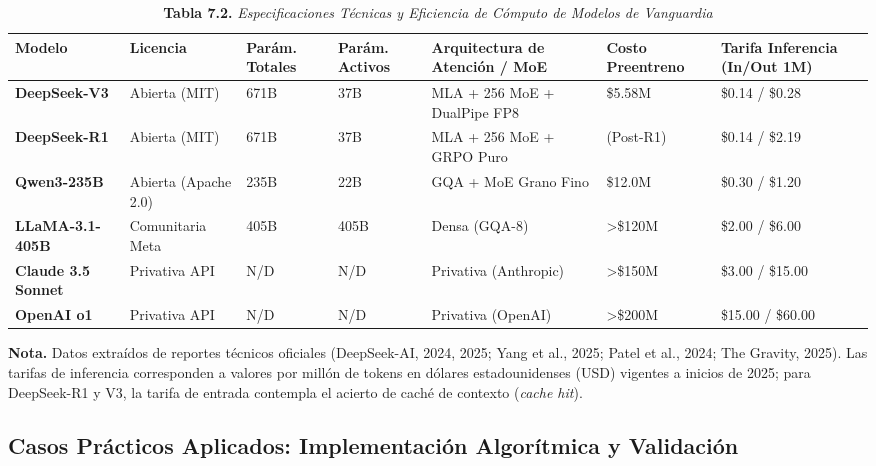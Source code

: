 \begin{table}[htpb!]
\centering
\footnotesize
\renewcommand{\arraystretch}{1.3}
\caption{\textbf{Tabla 7.2.} \textit{Especificaciones Técnicas y Eficiencia de Cómputo de Modelos de Vanguardia}}
\label{tab:modelos_comparativa}
\begin{tabularx}{\textwidth}{>{\raggedright\arraybackslash\bfseries}p{2.3cm} >{\raggedright\arraybackslash}p{2.0cm} >{\centering\arraybackslash}p{1.5cm} >{\centering\arraybackslash}p{1.5cm} >{\raggedright\arraybackslash}X >{\centering\arraybackslash}p{1.6cm} >{\centering\arraybackslash}p{2.2cm}}
\toprule
Modelo & Licencia & Parám. Totales & Parám. Activos & Arquitectura de Atención / MoE & Costo Preentreno & Tarifa Inferencia (In/Out 1M) \\
\midrule
DeepSeek-V3 & Abierta (MIT) & 671B & 37B & MLA + 256 MoE + DualPipe FP8 & \$5.58M & \$0.14 / \$0.28 \\
DeepSeek-R1 & Abierta (MIT) & 671B & 37B & MLA + 256 MoE + GRPO Puro & (Post-R1) & \$0.14 / \$2.19 \\
Qwen3-235B & Abierta (Apache 2.0) & 235B & 22B & GQA + MoE Grano Fino & \$12.0M & \$0.30 / \$1.20 \\
LLaMA-3.1-405B & Comunitaria Meta & 405B & 405B & Densa (GQA-8) & >\$120M & \$2.00 / \$6.00 \\
Claude 3.5 Sonnet & Privativa API & N/D & N/D & Privativa (Anthropic) & >\$150M & \$3.00 / \$15.00 \\
OpenAI o1 & Privativa API & N/D & N/D & Privativa (OpenAI) & >\$200M & \$15.00 / \$60.00 \\
\bottomrule
\end{tabularx}
\vspace{0.1cm}
\raggedright
\scriptsize \textbf{Nota.} Datos extraídos de reportes técnicos oficiales (DeepSeek-AI, 2024, 2025; Yang et al., 2025; Patel et al., 2024; The Gravity, 2025). Las tarifas de inferencia corresponden a valores por millón de tokens en dólares estadounidenses (USD) vigentes a inicios de 2025; para DeepSeek-R1 y V3, la tarifa de entrada contempla el acierto de caché de contexto (\textit{cache hit}).
\end{table}

\newpage

\subsection{Casos Prácticos Aplicados: Implementación Algorítmica y Validación}

